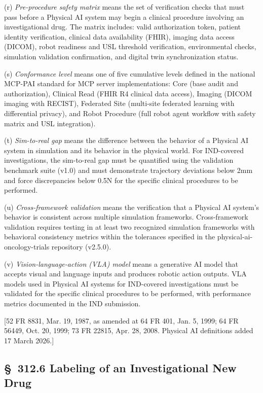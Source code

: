 \documentclass[11pt]{article}
\begin{document}
(r) \textit{Pre-procedure safety matrix} means the set of verification checks that must pass before a Physical AI system may begin a clinical procedure involving an investigational drug. The matrix includes: valid authorization token, patient identity verification, clinical data availability (FHIR), imaging data access (DICOM), robot readiness and USL threshold verification, environmental checks, simulation validation confirmation, and digital twin synchronization status.

(s) \textit{Conformance level} means one of five cumulative levels defined in the national MCP-PAI standard for MCP server implementations: Core (base audit and authorization), Clinical Read (FHIR R4 clinical data access), Imaging (DICOM imaging with RECIST), Federated Site (multi-site federated learning with differential privacy), and Robot Procedure (full robot agent workflow with safety matrix and USL integration).

(t) \textit{Sim-to-real gap} means the difference between the behavior of a Physical AI system in simulation and its behavior in the physical world. For IND-covered investigations, the sim-to-real gap must be quantified using the validation benchmark suite (v1.0) and must demonstrate trajectory deviations below 2mm and force discrepancies below 0.5N for the specific clinical procedures to be performed.

(u) \textit{Cross-framework validation} means the verification that a Physical AI system's behavior is consistent across multiple simulation frameworks. Cross-framework validation requires testing in at least two recognized simulation frameworks with behavioral consistency metrics within the tolerances specified in the physical-ai-oncology-trials repository (v2.5.0).

(v) \textit{Vision-language-action (VLA) model} means a generative AI model that accepts visual and language inputs and produces robotic action outputs. VLA models used in Physical AI systems for IND-covered investigations must be validated for the specific clinical procedures to be performed, with performance metrics documented in the IND submission.

[52 FR 8831, Mar. 19, 1987, as amended at 64 FR 401, Jan. 5, 1999; 64 FR 56449, Oct. 20, 1999; 73 FR 22815, Apr. 28, 2008. Physical AI definitions added 17 March 2026.]

\subsection{\S~312.6 Labeling of an Investigational New Drug}
\end{document}
